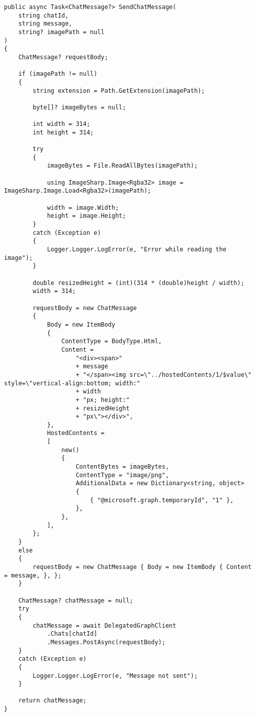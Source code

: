 \begin{lstlisting}[caption=Funzione per l'invio dei messaggi, label=lst:send-message-code]
public async Task<ChatMessage?> SendChatMessage(
	string chatId,
	string message,
	string? imagePath = null
)
{
	ChatMessage? requestBody;

	if (imagePath != null)
	{
		string extension = Path.GetExtension(imagePath);

		byte[]? imageBytes = null;

		int width = 314;
		int height = 314;

		try
		{
			imageBytes = File.ReadAllBytes(imagePath);

			using ImageSharp.Image<Rgba32> image = ImageSharp.Image.Load<Rgba32>(imagePath);

			width = image.Width;
			height = image.Height;
		}
		catch (Exception e)
		{
			Logger.Logger.LogError(e, "Error while reading the image");
		}

		double resizedHeight = (int)(314 * (double)height / width);
		width = 314;

		requestBody = new ChatMessage
		{
			Body = new ItemBody
			{
				ContentType = BodyType.Html,
				Content =
					"<div><span>"
					+ message
					+ "</span><img src=\"../hostedContents/1/$value\" style=\"vertical-align:bottom; width:"
					+ width
					+ "px; height:"
					+ resizedHeight
					+ "px\"></div>",
			},
			HostedContents =
			[
				new()
				{
					ContentBytes = imageBytes,
					ContentType = "image/png",
					AdditionalData = new Dictionary<string, object>
					{
						{ "@microsoft.graph.temporaryId", "1" },
					},
				},
			],
		};
	}
	else
	{
		requestBody = new ChatMessage { Body = new ItemBody { Content = message, }, };
	}

	ChatMessage? chatMessage = null;
	try
	{
		chatMessage = await DelegatedGraphClient
			.Chats[chatId]
			.Messages.PostAsync(requestBody);
	}
	catch (Exception e)
	{
		Logger.Logger.LogError(e, "Message not sent");
	}

	return chatMessage;
}
\end{lstlisting}